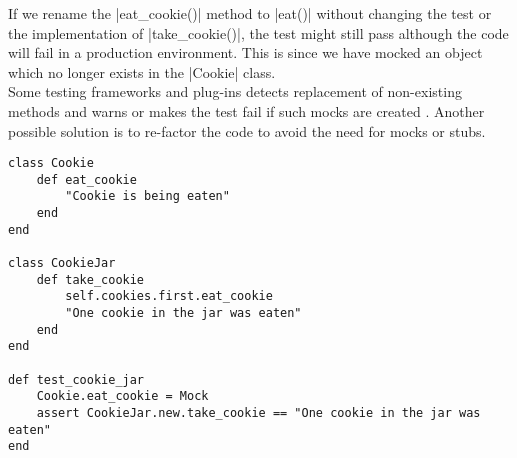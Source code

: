 If we rename the |eat_cookie()| method to |eat()| without changing the
test or the implementation of |take_cookie()|, the test might still pass
although the code will fail in a production environment. This is since
we have mocked an object which no longer exists in the |Cookie| class.\\

Some testing frameworks and plug-ins detects replacement of non-existing
methods and warns or makes the test fail if such mocks are created
\cite{video:boundaries}. Another possible solution is to re-factor the
code to avoid the need for mocks or stubs.\\

\begin{lstlisting}[caption=Example of how mocking might make tests pass even when they are not indented to, label=code:mocks, float=t]
class Cookie
    def eat_cookie
        "Cookie is being eaten"
    end
end

class CookieJar
    def take_cookie
        self.cookies.first.eat_cookie
        "One cookie in the jar was eaten"
    end
end

def test_cookie_jar
    Cookie.eat_cookie = Mock
    assert CookieJar.new.take_cookie == "One cookie in the jar was eaten"
end
\end{lstlisting}


